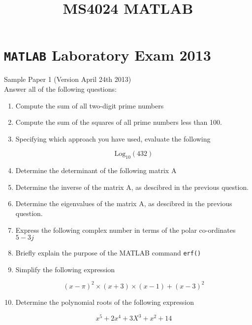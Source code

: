 \documentclass[12pt]{article}
\title{MS4024 MATLAB}
\begin{document}
\maketitle


\section*{\texttt{MATLAB} Laboratory Exam 2013}
Sample Paper 1 (Version April 24th 2013)\\
Answer all of the following questions:
\begin{enumerate}

\item Compute the sum of all two-digit prime numbers

\item Compute the sum of the squares of all prime numbers less than 100.

\item Specifying which approach you have used, evaluate the following

 \[ \mbox{Log}_{10}(432) \]


\item Determine the determinant of the following matrix A

\item Determine the inverse of the matrix A, as descibred in the previous question.

\item Determine the eigenvalues of the matrix A, as descibred in the previous question.

\item Express the following complex number in terms of the polar co-ordinates $5-3j$

\item Briefly explain the purpose of the MATLAB command \texttt{erf()}

\item Simplify the following expression

 \[ (x-\pi)^2 \times (x+3) \times (x-1) + (x-3)^2 \]

\item Determine the polynomial roots of the following expression
 
 \[ x^5 + 2x^4 + 3X^3+ x^2 + 14 \] 

\end{enumerate}
\end{document}
